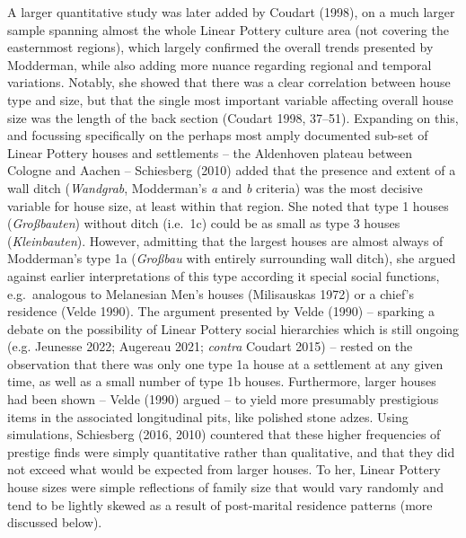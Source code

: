 \documentclass[
  12pt,
  a4paper, twoside]{book}
\begin{document}
A larger quantitative study was later added by Coudart (1998), on a much larger sample spanning almost the whole Linear Pottery culture area (not covering the easternmost regions), which largely confirmed the overall trends presented by Modderman, while also adding more nuance regarding regional and temporal variations. Notably, she showed that there was a clear correlation between house type and size, but that the single most important variable affecting overall house size was the length of the back section (Coudart 1998, 37--51). Expanding on this, and focussing specifically on the perhaps most amply documented sub-set of Linear Pottery houses and settlements -- the Aldenhoven plateau between Cologne and Aachen -- Schiesberg (2010) added that the presence and extent of a wall ditch (\emph{Wandgrab}, Modderman's \emph{a} and \emph{b} criteria) was the most decisive variable for house size, at least within that region. She noted that type 1 houses (\emph{Großbauten}) without ditch (i.e.~1c) could be as small as type 3 houses (\emph{Kleinbauten}). However, admitting that the largest houses are almost always of Modderman's type 1a (\emph{Großbau} with entirely surrounding wall ditch), she argued against earlier interpretations of this type according it special social functions, e.g.~analogous to Melanesian Men's houses (Milisauskas 1972) or a chief's residence (Velde 1990). The argument presented by Velde (1990) -- sparking a debate on the possibility of Linear Pottery social hierarchies which is still ongoing (e.g. Jeunesse 2022; Augereau 2021; \emph{contra} Coudart 2015) -- rested on the observation that there was only one type 1a house at a settlement at any given time, as well as a small number of type 1b houses. Furthermore, larger houses had been shown -- Velde (1990) argued -- to yield more presumably prestigious items in the associated longitudinal pits, like polished stone adzes. Using simulations, Schiesberg (2016, 2010) countered that these higher frequencies of prestige finds were simply quantitative rather than qualitative, and that they did not exceed what would be expected from larger houses. To her, Linear Pottery house sizes were simple reflections of family size that would vary randomly and tend to be lightly skewed as a result of post-marital residence patterns (more discussed below).
\end{document}
